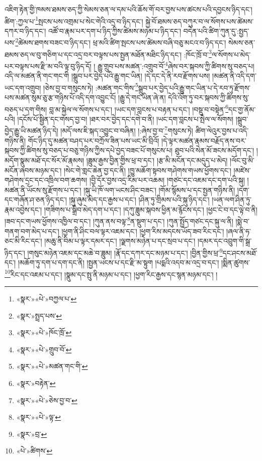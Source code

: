 འཇིག་རྟེན་གྱི་ཁམས་ཐམས་ཅད་ཀྱི་སེམས་ཅན་ལ་དམ་པའི་ཆོས་གོ་བར་བྱས་པས་ཚངས་པའི་དབྱངས་ཉིད་དང་། ཚིག་:ཀྱལ་པ་\footnote{«སྣར་»«པེ་»བཀྱལ་པ་}སྤངས་པས་འགྲམ་པ་སེང་གེའི་འདྲ་བ་ཉིད་དང་། སྐྱེ་བོ་ཐམས་ཅད་བཀུར་བ་ལ་སོགས་པས་ཚེམས་དཀར་བ་ཉིད་དང་། འཚོ་བ་རྣམ་པར་དག་པ་ཉིད་ཀྱིས་ཚེམས་མཉམ་པ་ཉིད་དང་། བདེན་པའི་ཚིག་ཀུན་དུ་:སྤྱད་པས་\footnote{«སྣར་»སྤྲད་པས་}ཚེམས་ཐགས་བཟང་བ་ཉིད་དང་། ཕྲ་མའི་ཚིག་སྤངས་པས་ཚེམས་བཞི་བཅུ་མངའ་བ་ཉིད་དང་། སེམས་ཅན་ཐམས་ཅད་ལ་བུ་གཅིག་པ་དང་འདྲ་བར་བལྟས་པས་སྤྱན་མཐོན་མཐིང་ཉིད་དང་། :ཁོང་ཁྲོ་བ་\footnote{«སྣར་»«པེ་»ཁོང་ཁྲོ་}ལ་སོགས་པ་མེད་པར་བལྟས་པས་རྫི་མ་བའི་ལྟ་བུ་ཉིད་དོ། །
རྒྱུ་གྲུབ་པས་མཚན་:འགྲུབ་བོ་\footnote{«སྣར་»«པེ་»གྲུབ་བོ་}ཞེས་བར་སྐབས་ཀྱི་ཚིགས་སུ་བཅད་པ། འདི་ལ་མཚན་ནི་གང་གང་གི །སྒྲུབ་པར་བྱེད་པའི་རྒྱུ་གང་ཡིན། །དེ་དང་དེ་ནི་རབ་རྫོགས་པས། །མཚན་ནི་འདི་དག་ཡང་དག་འགྲུབ། །ཅེས་བྱ་བ་གསུངས་ཏེ། :མཚན་གང་གིས་\footnote{«སྣར་»«པེ་»མཚན་གང་གི་}སྒྲུབ་པར་བྱེད་པའི་རྒྱུ་གང་ཡིན་པ་དེ་རབ་ཏུ་རྫོགས་པས་མཚན་སུམ་ཅུ་རྩ་གཉིས་པོ་འདི་དག་འབྱུང་ངོ། །རྒྱུ་དེ་གང་ཡིན་ཞེ་ན། དེའི་འོག་ཏུ་བར་སྐབས་ཀྱི་ཚིགས་སུ་བཅད་པ་དག་གིས། བླ་མ་སྐྱེལ་ལ་སོགས་པ་དང་། །ཡང་དག་བླངས་པ་བརྟན་པ་དང་། །བསྡུ་བ་བསྟེན་\footnote{«སྣར་»བརྟེན་}དང་གྱ་ནོམ་པའི། །དངོས་པོ་སྦྱིན་དང་གསད་བྱ་བ། །ཐར་བར་བྱེད་དང་དགེ་བ་ནི། །ཡང་དག་བླངས་པ་སྤེལ་ལ་སོགས། །སྒྲུབ་བྱེད་རྒྱུ་ཡི་མཚན་ཉིད་དེ། །མདོ་ལས་ཇི་སྐད་འབྱུང་བ་བཞིན། །:ཞེས་བྱ་བ་\footnote{«སྣར་»«པེ་»ཅེས་བྱ་བ་}གསུངས་ཏེ། ཚིག་ལེའུར་བྱས་པ་འདི་གཉིས་ནི། གོང་ཉིད་དུ་མཚན་བཤད་པར་བཀྲོལ་ཟིན་པས་ཡང་མི་བྲིའོ། །དེ་ལྟར་མཚན་རྣམས་བརྗོད་ནས་བར་སྐབས་ཀྱི་ཚིགས་སུ་བཅད་པ་བཅུ་གཉིས་ཀྱིས་དཔེ་བྱད་བཟང་པོ་གསུངས་པ། ཐུབ་པའི་སེན་མོ་ཟངས་མདོག་དང་། །མདོག་སྣུམ་མཐོ་དང་སོར་མོ་རྣམས། །ཟླུམ་རྒྱས་བྱིན་གྱིས་ཕྲ་བ་དང་། །རྩ་མི་མངོན་དང་མདུད་པ་མེད། །ལོང་བུ་མི་མངོན་ཞབས་མཉམ་དང་། །སེང་གེ་གླང་ཆེན་བྱ་དང་ནི། །ཁྱུ་མཆོག་སྟབས་གཤེགས་གཡས་ཕྱོགས་དང་། །མཛེས་གཤེགས་དྲང་དང་འཁྲིལ་བག་ཆགས། །བྱི་དོར་བྱས་འདྲ་རིམ་པར་འཆམ། །གཙང་དང་འཇམ་དང་དག་པའི་སྐུ། །མཚན་ནི་ཡོངས་སུ་རྫོགས་པ་དང་། །སྐུ་ཡི་ཁོ་ལག་ཡངས་ཤིང་བཟང་། །གོམ་སྙོམས་པ་དང་སྤྱན་གཉིས་ནི། །དག་དང་གཞོན་ཤ་ཅན་ཉིད་དང་། །སྐུ་ཞུམ་མེད་དང་རྒྱས་པ་དང་། །ཤིན་ཏུ་གྲིམས་པའི་སྐུ་ཉིད་དང་། །ཡན་ལག་ཤིན་ཏུ་རྣམ་འབྱེས་དང་། །གཟིགས་པ་སྒྲིབ་མེད་དག་པ་དང་། །དཀུ་ཟླུམ་སྐབས་ཕྱིན་མ་རྙོངས་དང་། །ཕྱང་ངེ་བ་དང་ལྟེ་བ་ནི། །ཟབ་དང་གཡས་ཕྱོགས་འཁྱིལ་བ་དང་། །ཀུན་ནས་བལྟ་\footnote{«སྣར་»«པེ་»ལྟ་}ན་སྡུག་པ་དང་། །ཀུན་སྤྱོད་གཙང་དང་སྐུ་ལ་ནི། །སྨེ་བ་གནག་བག་མེད་པ་དང་། །ཕྱག་ནི་ཤིང་བལ་ལྟར་འཇམ་དང་། །ཕྱག་རིས་མདངས་ཡོད་ཟབ་རིང་དང་། །ཞལ་ནི་ཧ་ཅང་མི་རིང་དང་། །མཆུ་ནི་བིམ་པ་ལྟར་དམར་དང་། །ལྗགས་མཉེན་པ་དང་སྲབ་པ་དང་། །དམར་དང་འབྲུག་གི་སྒྲ་ཉིད་དང་། །གསུང་མཉེན་འཇམ་དང་མཆེ་བ་ཟླུམ། །རྣོ་དང་དཀར་དང་མཉམ་པ་དང་། །བྱིན་གྱིས་ཕྲ་\footnote{«སྣར་»བྲ་}དང་ཤངས་མཐོ་དང་། །མཆོག་ཏུ་དག་པ་དག་དང་ནི། །སྤྱན་ཡངས་པ་དང་རྫི་མ་སྟུག །པདྨའི་འདབ་མ་འདྲ་བ་དང་། །སྨིན་ཚུགས་\footnote{«པེ་»ཚིགས་}རིང་དང་འཇམ་པ་དང་། །སྣུམ་དང་སྤུ་ནི་མཉམ་པ་དང་། །ཕྱག་རིང་རྒྱས་དང་སྙན་མཉམ་དང་། །
